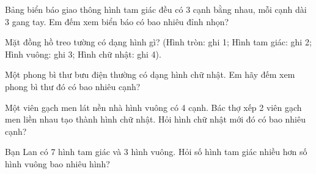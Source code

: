 \begin{ex} %
Bảng biển báo giao thông hình tam giác đều có 3 cạnh bằng nhau, mỗi cạnh dài 3 gang tay. Em đếm xem biển báo có bao nhiêu đỉnh nhọn?
\end{ex}

\begin{ex} %
Mặt đồng hồ treo tường có dạng hình gì? (Hình tròn: ghi 1; Hình tam giác: ghi 2; Hình vuông: ghi 3; Hình chữ nhật: ghi 4).
\end{ex}

\begin{ex} %
Một phong bì thư bưu điện thường có dạng hình chữ nhật. Em hãy đếm xem phong bì thư đó có bao nhiêu cạnh?
\end{ex}

\begin{ex} %
Một viên gạch men lát nền nhà hình vuông có 4 cạnh. Bác thợ xếp 2 viên gạch men liền nhau tạo thành hình chữ nhật. Hỏi hình chữ nhật mới đó có bao nhiêu cạnh?
\end{ex}

\begin{ex} %
Bạn Lan có 7 hình tam giác và 3 hình vuông. Hỏi số hình tam giác nhiều hơn số hình vuông bao nhiêu hình?
\end{ex}
